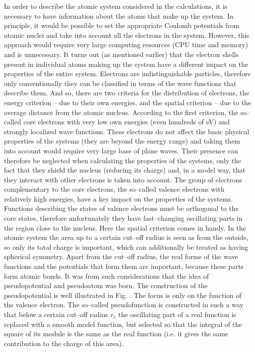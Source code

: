 In order to describe the atomic system considered in the calculations, it is necessary to have information about the atoms that make up the system.
In principle, it would be possible to set the appropriate Coulomb potentials from atomic nuclei and take into account all the electrons in the system.
However, this approach would require very large computing resources (CPU time and memory) and is unnecessary.
It turns out (as mentioned earlier) that the electron shells present in individual atoms making up the system have a different impact on the properties of the entire system.
Electrons are indistinguishable particles, therefore only conventionally they can be classified in terms of the wave functions that describe them.
And so, there are two criteria for the distribution of electrons, the energy criterion -- due to their own energies, and the spatial criterion -- due to the average distance from the atomic nucleus.
According to the first criterion, the so--called core electrons with very low own energies (even hundreds of eV) and strongly localized wave functions.
These electrons do not affect the basic physical properties of the systems (they are beyond the energy range) and taking them into account would require very large base of plane waves.
Their presence can therefore be neglected when calculating the properties of the systems, only the fact that they shield the nucleus (reducing its charge) and, in a model way, that they interact with other electrons is taken into account.
The group of electrons complementary to the core electrons, the so--called valence electrons with relatively high energies, have a key impact on the properties of the systems.
Functions describing the states of valence electrons must be orthogonal to the core states, therefore unfortunately they have fast--changing oscillating parts in the region close to the nucleus.
Here the spatial criterion comes in handy.
In the atomic system the area up to a certain cut--off radius is seen as from the outside, so only its total charge is important, which can additionally be treated as having spherical symmetry.
Apart from the cut--off radius, the real forms of the wave functions and the potentials that form them are important, because these parts form atomic bonds.
It was from such considerations that the idea of pseudopotential and pseudoatom was born.
The construction of the pseudopotential is well illustrated in Fig. .
The focus is only on the function of the valence electron.
The so--called pseudofunction is constructed in such a way that below a certain cut--off radius $r_c$ the oscillating part of a real function is replaced  with a smooth model function, but selected so that the integral of the square of its module is the same as the real function (i.e. it gives the same contribution to the charge of this area).
